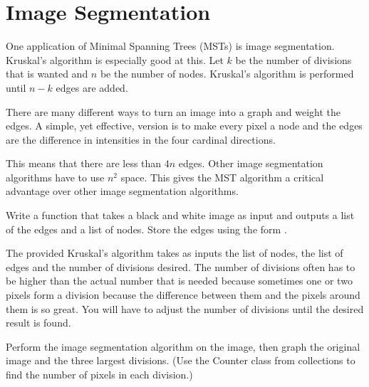 \label{Ch:MSTImgSeg}


\section*{Image Segmentation}


One application of Minimal Spanning Trees (MSTs) is image segmentation.
Kruskal's algorithm is especially good at this.
Let $k$ be the number of divisions that is wanted and $n$ be the number of nodes.
Kruskal's algorithm is performed until $n-k$ edges are added.

There are many different ways to turn an image into a graph and weight the edges.
A simple, yet effective, version is to make every pixel a node and the edges are the difference in intensities in the four cardinal directions. 

This means that there are less than $4n$ edges.
Other image segmentation algorithms have to use $n^2$ space.
This gives the MST algorithm a critical advantage over other image segmentation algorithms. 

\begin{problem}
Write a function that takes a black and white image as input and outputs a list of the edges and a list of nodes.
Store the edges using the form .
\end{problem}

The provided Kruskal's algorithm takes as inputs the list of nodes, the list of edges and the number of divisions desired.
The number of divisions often has to be higher than the actual number that is needed because sometimes one or two pixels form a division because the difference between them and the pixels around them is so great.
You will have to adjust the number of divisions until the desired result is found.

\begin{problem}
Perform the image segmentation algorithm on the image, then graph the original image and the three largest divisions.
(Use the Counter class from collections to find the number of pixels in each division.) 
\end{problem}

